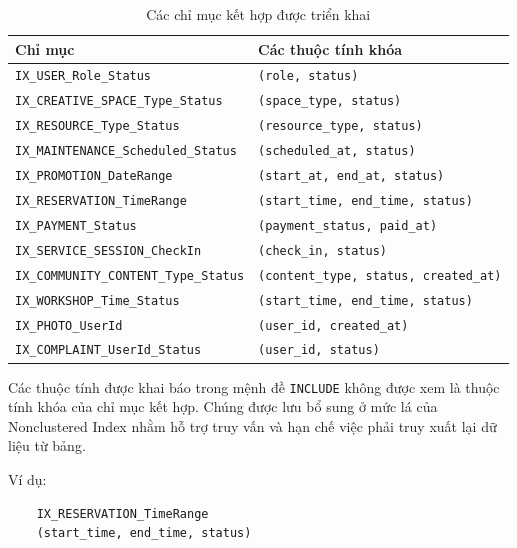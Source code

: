 \begin{table}[htbp]
	\centering
	\label{tab:composite_indexes}
	\renewcommand{\arraystretch}{1.2}
	\scriptsize
	\begin{tabularx}{\linewidth}{|p{6.8cm}|X|}
		\hline
		\textbf{Chỉ mục} & \textbf{Các thuộc tính khóa} \\
		\hline
		\texttt{IX\_USER\_Role\_Status} &
		\texttt{(role, status)} \\
		\hline
		\texttt{IX\_CREATIVE\_SPACE\_Type\_Status} &
		\texttt{(space\_type, status)} \\
		\hline
		\texttt{IX\_RESOURCE\_Type\_Status} &
		\texttt{(resource\_type, status)} \\
		\hline
		\texttt{IX\_MAINTENANCE\_Scheduled\_Status} &
		\texttt{(scheduled\_at, status)} \\
		\hline
		\texttt{IX\_PROMOTION\_DateRange} &
		\texttt{(start\_at, end\_at, status)} \\
		\hline
		\texttt{IX\_RESERVATION\_TimeRange} &
		\texttt{(start\_time, end\_time, status)} \\
		\hline
		\texttt{IX\_PAYMENT\_Status} &
		\texttt{(payment\_status, paid\_at)} \\
		\hline
		\texttt{IX\_SERVICE\_SESSION\_CheckIn} &
		\texttt{(check\_in, status)} \\
		\hline
		\texttt{IX\_COMMUNITY\_CONTENT\_Type\_Status} &
		\texttt{(content\_type, status, created\_at)} \\
		\hline
		\texttt{IX\_WORKSHOP\_Time\_Status} &
		\texttt{(start\_time, end\_time, status)} \\
		\hline
		\texttt{IX\_PHOTO\_UserId} &
		\texttt{(user\_id, created\_at)} \\
		\hline
		\texttt{IX\_COMPLAINT\_UserId\_Status} &
		\texttt{(user\_id, status)} \\
		\hline
	\end{tabularx}
	\caption{Các chỉ mục kết hợp được triển khai}
\end{table}

Các thuộc tính được khai báo trong mệnh đề \texttt{INCLUDE} không được
xem là thuộc tính khóa của chỉ mục kết hợp. Chúng được lưu bổ sung ở mức
lá của Nonclustered Index nhằm hỗ trợ truy vấn và hạn chế việc phải truy
xuất lại dữ liệu từ bảng.

Ví dụ:

\begin{verbatim}
	IX_RESERVATION_TimeRange
	(start_time, end_time, status)
\end{verbatim}

